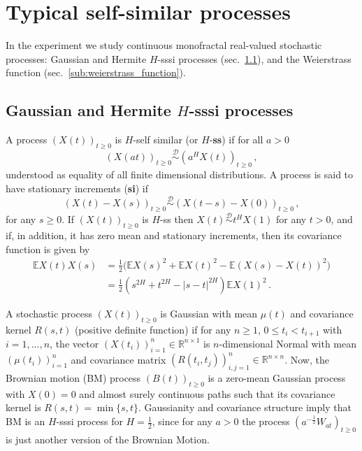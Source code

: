 \documentclass[a4paper]{article}
\newcommand{\Real}{\mathbb{R}}
\newcommand{\ex}{\mathbb{E}}
\newcommand{\Dcal}{\mathcal{D}}
\begin{document}


\section{Typical self-similar processes} %
\label{sec:self_sim_processes}

In the experiment we study continuous monofractal real-valued stochastic processes:
Gaussian and Hermite $H$-sssi processes (sec.~\ref{sub:h_sssi_proc}), and the Weierstrass
function (sec.~\ref{sub:weierstrass_function}).

\subsection{Gaussian and Hermite $H$-sssi processes} %
\label{sub:h_sssi_proc}

A process $(X(t))_{t\geq0}$ is $H$-self similar (or $H$-\textbf{ss}) if for all $a>0$
\begin{equation*} \label{eq:def_ss}
    (X(at))_{t\geq0} \overset{\Dcal}{\sim} (a^H X(t))_{t\geq0} \,,
\end{equation*}
understood as equality of all finite dimensional distributions. A process is said
to have stationary increments (\textbf{si}) if
\begin{equation*}\label{eq:def_si}
    (X(t)-X(s))_{t\geq0} \overset{\Dcal}{\sim} (X(t-s)-X(0))_{t\geq0} \,,
\end{equation*}
for any $s\geq 0$. If $(X(t))_{t\geq0}$ is $H$-ss then $X(t) \overset{\Dcal}{\sim} t^H X(1)$
for any $t>0$, and if, in addition, it has zero mean and stationary increments, then
its covariance function is given by
\begin{align}\label{eq:h_sssi_cov}
    \ex X(t) X(s)
        &= \frac{1}{2} \bigl(\ex X(s)^2 + \ex X(t)^2 - \ex(X(s) - X(t))^2 \bigr) \nonumber \\
        &= \frac{1}{2} (s^{2H}  + t^{2H} - |s-t|^{2H}) \ex X(1)^2 \,.
\end{align}

A stochastic process $(X(t))_{t\geq0}$ is Gaussian with mean $\mu(t)$ and covariance
kernel $R(s,t)$ (positive definite function) if for any $n\geq 1$, $0 \leq t_i < t_{i+1}$
with $i=1,\ldots,n$, the vector $(X(t_i))_{i=1}^n\in \Real^{n\times1}$ is $n$-dimensional
Normal with mean $(\mu(t_i))_{i=1}^n$ and covariance matrix $(R(t_i, t_j))_{i,j=1}^n\in \Real^{n\times n}$.
Now, the Brownian motion (BM) process $(B(t))_{t\geq0}$ is a zero-mean Gaussian process
with $X(0)=0$ and almost surely continuous paths such that its covariance kernel is
$R(s,t)=\min\{s, t\}$. Gaussianity and covariance structure imply that BM is an $H$-sssi
process for $H=\frac{1}{2}$, since for any $a>0$ the process $(a^{-\frac{1}{2}} W_{at})_{t\geq0}$
is just another version of the Brownian Motion.
\end{document}
